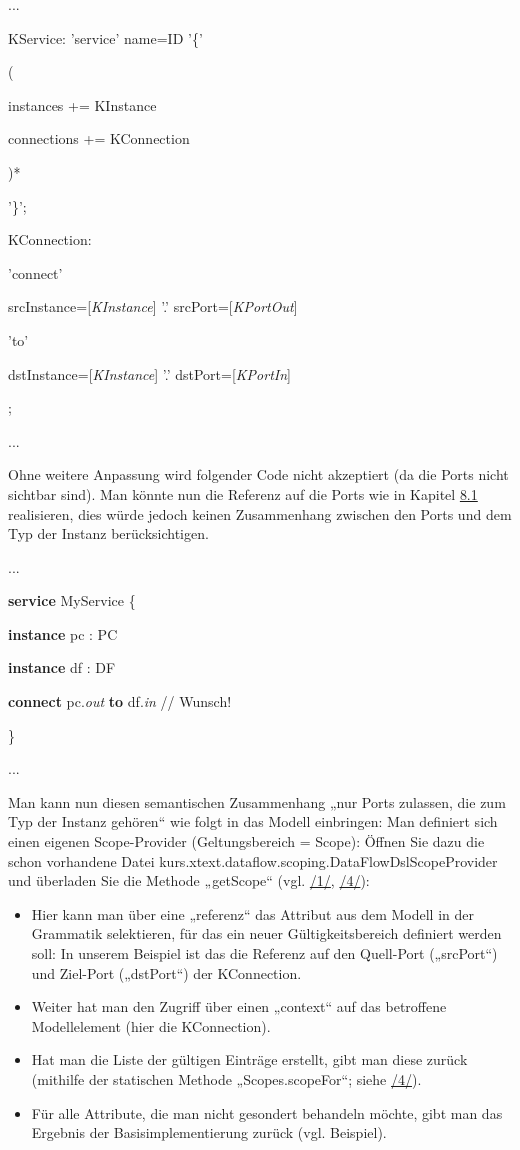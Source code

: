 \documentclass[]{article}
\providecommand{\tightlist}{%
  \setlength{\itemsep}{0pt}\setlength{\parskip}{0pt}}
\begin{document}
...

KService: 'service' name=ID '\{'

(

instances += KInstance\textbar{}

connections += KConnection

)*

'\}';

KConnection:

'connect'

srcInstance={[}\emph{KInstance}{]} '.' srcPort={[}\emph{KPortOut}{]}

'to'

dstInstance={[}\emph{KInstance}{]} '.' dstPort={[}\emph{KPortIn}{]}

;

...

Ohne weitere Anpassung wird folgender Code nicht akzeptiert (da die
Ports nicht sichtbar sind). Man könnte nun die Referenz auf die Ports
wie in Kapitel \protect\hyperlink{anchor-43}{8.1} realisieren, dies
würde jedoch keinen Zusammenhang zwischen den Ports und dem Typ der
Instanz berücksichtigen.

...

\textbf{service} MyService \{

\textbf{instance} pc : PC

\textbf{instance} df : DF

\textbf{connect} pc.\emph{out} \textbf{to} df.\emph{in} // Wunsch!

\}

...

Man kann nun diesen semantischen Zusammenhang „nur Ports zulassen, die
zum Typ der Instanz gehören`` wie folgt in das Modell einbringen: Man
definiert sich einen eigenen Scope-Provider (Geltungsbereich = Scope):
Öffnen Sie dazu die schon vorhandene Datei
kurs.xtext.dataflow.scoping.DataFlowDslScopeProvider und überladen Sie
die Methode „getScope`` (vgl. \protect\hyperlink{anchor-1}{/1/},
\protect\hyperlink{anchor-4}{/4/}):

\begin{itemize}
\tightlist
\item
  Hier kann man über eine „referenz`` das Attribut aus dem Modell in der
  Grammatik selektieren, für das ein neuer Gültigkeitsbereich definiert
  werden soll: In unserem Beispiel ist das die Referenz auf den
  Quell-Port („srcPort``) und Ziel-Port („dstPort``) der KConnection.
\item
  Weiter hat man den Zugriff über einen „context`` auf das betroffene
  Modellelement (hier die KConnection).
\item
  Hat man die Liste der gültigen Einträge erstellt, gibt man diese
  zurück (mithilfe der statischen Methode „Scopes.scopeFor``; siehe
  \protect\hyperlink{anchor-4}{/4/}).
\item
  Für alle Attribute, die man nicht gesondert behandeln möchte, gibt man
  das Ergebnis der Basisimplementierung zurück (vgl. Beispiel).
\end{itemize}
\end{document}
